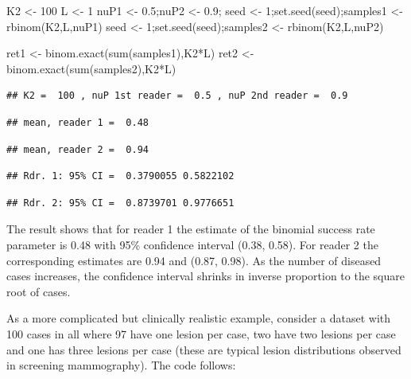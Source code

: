 \documentclass[
]{book}
\newenvironment{Shaded}{\begin{snugshade}}{\end{snugshade}}
\newcommand{\DecValTok}[1]{\textcolor[rgb]{0.00,0.00,0.81}{#1}}
\newcommand{\FloatTok}[1]{\textcolor[rgb]{0.00,0.00,0.81}{#1}}
\newcommand{\FunctionTok}[1]{\textcolor[rgb]{0.00,0.00,0.00}{#1}}
\newcommand{\NormalTok}[1]{#1}
\newcommand{\OtherTok}[1]{\textcolor[rgb]{0.56,0.35,0.01}{#1}}
\newcommand{\SpecialCharTok}[1]{\textcolor[rgb]{0.00,0.00,0.00}{#1}}
\begin{document}
\begin{Shaded}
\begin{Highlighting}[]
\NormalTok{K2 }\OtherTok{\textless{}{-}} \DecValTok{100}
\NormalTok{L }\OtherTok{\textless{}{-}} \DecValTok{1}
\NormalTok{nuP1 }\OtherTok{\textless{}{-}} \FloatTok{0.5}\NormalTok{;nuP2 }\OtherTok{\textless{}{-}} \FloatTok{0.9}\NormalTok{;}
\NormalTok{seed }\OtherTok{\textless{}{-}} \DecValTok{1}\NormalTok{;}\FunctionTok{set.seed}\NormalTok{(seed);samples1 }\OtherTok{\textless{}{-}} \FunctionTok{rbinom}\NormalTok{(K2,L,nuP1)}
\NormalTok{seed }\OtherTok{\textless{}{-}} \DecValTok{1}\NormalTok{;}\FunctionTok{set.seed}\NormalTok{(seed);samples2 }\OtherTok{\textless{}{-}} \FunctionTok{rbinom}\NormalTok{(K2,L,nuP2)}

\NormalTok{ret1 }\OtherTok{\textless{}{-}} \FunctionTok{binom.exact}\NormalTok{(}\FunctionTok{sum}\NormalTok{(samples1),K2}\SpecialCharTok{*}\NormalTok{L)}
\NormalTok{ret2 }\OtherTok{\textless{}{-}} \FunctionTok{binom.exact}\NormalTok{(}\FunctionTok{sum}\NormalTok{(samples2),K2}\SpecialCharTok{*}\NormalTok{L)}
\end{Highlighting}
\end{Shaded}

\begin{verbatim}
## K2 =  100 , nuP 1st reader =  0.5 , nuP 2nd reader =  0.9
\end{verbatim}

\begin{verbatim}
## mean, reader 1 =  0.48
\end{verbatim}

\begin{verbatim}
## mean, reader 2 =  0.94
\end{verbatim}

\begin{verbatim}
## Rdr. 1: 95% CI =  0.3790055 0.5822102
\end{verbatim}

\begin{verbatim}
## Rdr. 2: 95% CI =  0.8739701 0.9776651
\end{verbatim}

The result shows that for reader 1 the estimate of the binomial success rate parameter is 0.48 with 95\% confidence interval (0.38, 0.58). For reader 2 the corresponding estimates are 0.94 and (0.87, 0.98). As the number of diseased cases increases, the confidence interval shrinks in inverse proportion to the square root of cases.

As a more complicated but clinically realistic example, consider a dataset with 100 cases in all where 97 have one lesion per case, two have two lesions per case and one has three lesions per case (these are typical lesion distributions observed in screening mammography). The code follows:
\end{document}

